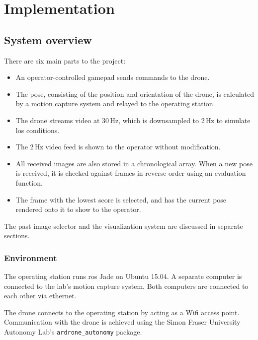 \chapter{Implementation}
\label{ch:implementation}

\section{System overview}
  There are six main parts to the project:

  \begin{itemize}
    \item An operator-controlled gamepad sends commands to the drone.
    \item The pose, consisting of the position and orientation of the drone, is calculated by a motion capture system and relayed to the operating station.
    \item The drone streams video at 30\,Hz, which is downsampled to 2\,Hz to simulate \gls{los} conditions.
    \item The 2\,Hz video feed is shown to the operator without modification.
    \item All received images are also stored in a chronological array.
	  When a new pose is received, it is checked against frames in reverse order using an evaluation function.
    \item The frame with the lowest score is selected, and has the current pose rendered onto it to show to the operator.
  \end{itemize}

  The past image selector and the visualization system are discussed in separate sections.

  \subsection{Environment}
    The operating station runs \gls{ros} Jade on Ubuntu 15.04.
    A separate computer is connected to the lab's motion capture system.
    Both computers are connected to each other via ethernet.

    The drone connects to the operating station by acting as a Wifi access point.
    Communication with the drone is achieved using the Simon Fraser University Autonomy Lab's \verb|ardrone_autonomy| package.

